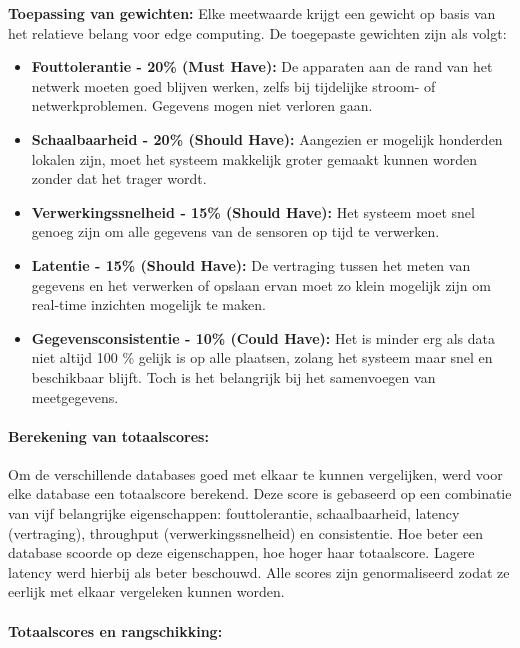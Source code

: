 \textbf{Toepassing van gewichten:} Elke meetwaarde krijgt een gewicht op basis van het relatieve belang voor edge computing. De toegepaste gewichten zijn als volgt:
\begin{itemize} 
	\item \textbf{Fouttolerantie - 20\% (Must Have):}  
	De apparaten aan de rand van het netwerk moeten goed blijven werken, zelfs bij tijdelijke stroom- of netwerkproblemen. Gegevens mogen niet verloren gaan.

	\item \textbf{Schaalbaarheid - 20\% (Should Have):}  
	Aangezien er mogelijk honderden lokalen zijn, moet het systeem makkelijk groter gemaakt kunnen worden zonder dat het trager wordt.

	\item \textbf{Verwerkingssnelheid - 15\% (Should Have):}  
	Het systeem moet snel genoeg zijn om alle gegevens van de sensoren op tijd te verwerken.

	\item \textbf{Latentie - 15\% (Should Have):}  
	De vertraging tussen het meten van gegevens en het verwerken of opslaan ervan moet zo klein mogelijk zijn om real-time inzichten mogelijk te maken.

	\item \textbf{Gegevensconsistentie - 10\% (Could Have):}  
	Het is minder erg als data niet altijd 100 \% gelijk is op alle plaatsen, zolang het systeem maar snel en beschikbaar blijft. Toch is het belangrijk bij het samenvoegen van meetgegevens.
\end{itemize}

\paragraph{Berekening van totaalscores:} 
Om de verschillende databases goed met elkaar te kunnen vergelijken, werd voor elke database een totaalscore berekend. Deze score is gebaseerd op een combinatie van vijf belangrijke eigenschappen: fouttolerantie, schaalbaarheid, latency (vertraging), throughput (verwerkingssnelheid) en consistentie. Hoe beter een database scoorde op deze eigenschappen, hoe hoger haar totaalscore. Lagere latency werd hierbij als beter beschouwd. Alle scores zijn genormaliseerd zodat ze eerlijk met elkaar vergeleken kunnen worden.

\paragraph{Totaalscores en rangschikking:}


